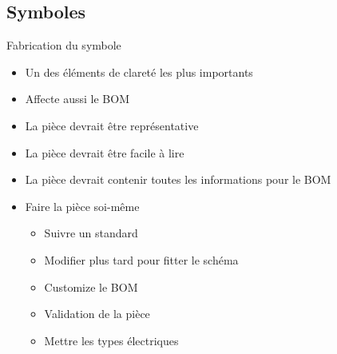 
\subsection{Symboles}

\begin{frame}{Fabrication du symbole}
    \begin{twocolumns}[0.6]
        \leftcol
        \begin{itemize}
            \item Un des éléments de clareté les plus importants
            \item Affecte aussi le BOM
            \bigskip
            \item La pièce devrait être représentative
            \item La pièce devrait être facile à lire
            \item La pièce devrait contenir toutes les informations pour le BOM
            \bigskip
            \item Faire la pièce soi-même
            \begin{itemize}
                \item Suivre un standard
                \item Modifier plus tard pour fitter le schéma
                \item Customize le BOM
                \item Validation de la pièce
                \item Mettre les types électriques
            \end{itemize}
        \end{itemize}

        \rightcol
    \end{twocolumns}
\end{frame}

